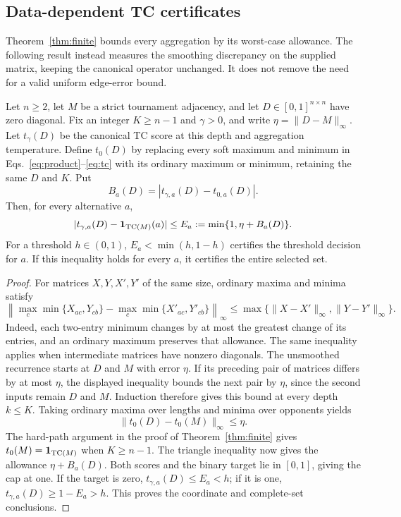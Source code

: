 \subsection{Data-dependent TC certificates}\label{app:tc-certificates}
Theorem~\ref{thm:finite} bounds every aggregation by its worst-case allowance. The following result instead measures the smoothing discrepancy on the supplied matrix, keeping the canonical operator unchanged. It does not remove the need for a valid uniform edge-error bound.

\begin{proposition}\label{prop:tc-computable-certificate}
Let $n\ge2$, let $M$ be a strict tournament adjacency, and let $D\in[0,1]^{n\times n}$ have zero diagonal. Fix an integer $K\ge n-1$ and $\gamma>0$, and write $\eta=\|D-M\|_\infty$. Let $t_\gamma(D)$ be the canonical TC score at this depth and aggregation temperature. Define $t_0(D)$ by replacing every soft maximum and minimum in Eqs.~\eqref{eq:product}--\eqref{eq:tc} with its ordinary maximum or minimum, retaining the same $D$ and $K$. Put
\[
B_a(D)=|t_{\gamma,a}(D)-t_{0,a}(D)|.
\]
Then, for every alternative $a$,
\[
|t_{\gamma,a}(D)-\mathbf1_{\mathrm{TC}(M)}(a)|
\le E_a:=\min\{1,\eta+B_a(D)\}.
\]
For a threshold $h\in(0,1)$, $E_a<\min(h,1-h)$ certifies the threshold decision for $a$. If this inequality holds for every $a$, it certifies the entire selected set.
\end{proposition}
\begin{proof}
For matrices $X,Y,X',Y'$ of the same size, ordinary maxima and minima satisfy
\[
\left\|\max_c\min\{X_{ac},Y_{cb}\}
-\max_c\min\{X'_{ac},Y'_{cb}\}\right\|_\infty
\le\max\{\|X-X'\|_\infty,\|Y-Y'\|_\infty\}.
\]
Indeed, each two-entry minimum changes by at most the greatest change of its entries, and an ordinary maximum preserves that allowance. The same inequality applies when intermediate matrices have nonzero diagonals. The unsmoothed recurrence starts at $D$ and $M$ with error $\eta$. If its preceding pair of matrices differs by at most $\eta$, the displayed inequality bounds the next pair by $\eta$, since the second inputs remain $D$ and $M$. Induction therefore gives this bound at every depth $k\le K$. Taking ordinary maxima over lengths and minima over opponents yields
\[
\|t_0(D)-t_0(M)\|_\infty\le\eta.
\]
The hard-path argument in the proof of Theorem~\ref{thm:finite} gives $t_0(M)=\mathbf1_{\mathrm{TC}(M)}$ when $K\ge n-1$. The triangle inequality now gives the allowance $\eta+B_a(D)$. Both scores and the binary target lie in $[0,1]$, giving the cap at one. If the target is zero, $t_{\gamma,a}(D)\le E_a<h$; if it is one, $t_{\gamma,a}(D)\ge1-E_a>h$. This proves the coordinate and complete-set conclusions.
\end{proof}

